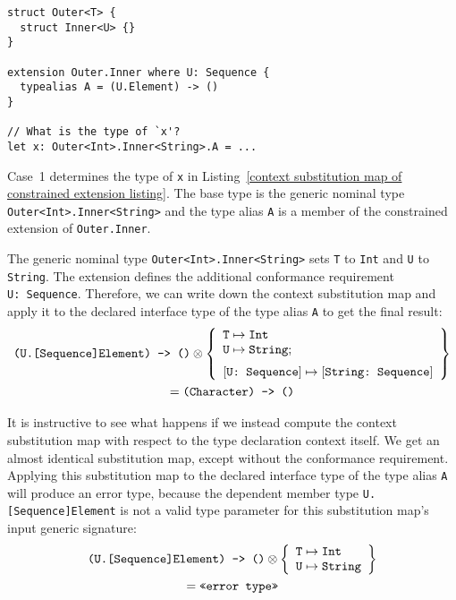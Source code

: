 \documentclass[../generics]{subfiles}
\begin{document}
\begin{listing}\label{context substitution map of constrained extension listing}
\begin{Verbatim}
struct Outer<T> {
  struct Inner<U> {}
}

extension Outer.Inner where U: Sequence {
  typealias A = (U.Element) -> ()
}

// What is the type of `x'?
let x: Outer<Int>.Inner<String>.A = ...
\end{Verbatim}
\end{listing}
\begin{example}
Case~1 determines the type of \texttt{x} in Listing~\ref{context substitution map of constrained extension listing}. The base type is the generic nominal type \texttt{Outer<Int>.Inner<String>} and the type alias \texttt{A} is a member of the constrained extension of \texttt{Outer.Inner}.

The generic nominal type \texttt{Outer<Int>.Inner<String>} sets \texttt{T} to \texttt{Int} and \texttt{U} to \texttt{String}. The extension defines the additional conformance requirement \texttt{U:~Sequence}. Therefore, we can write down the context substitution map and apply it to the declared interface type of the type alias \texttt{A} to get the final result:
\begin{multline*}
\texttt{(U.[Sequence]Element) -> ()} \otimes
\SubstMapLongC{
\SubstType{T}{Int}\\
\SubstType{U}{String}
}{
\SubstConf{U}{String}{Sequence}
}\\
= \texttt{(Character) -> ()}
\end{multline*}
\end{example}
\begin{example}
It is instructive to see what happens if we instead compute the context substitution map with respect to the type declaration context itself. We get an almost identical substitution map, except without the conformance requirement. Applying this substitution map to the declared interface type of the type alias \texttt{A} will produce an error type, because the dependent member type \texttt{U.[Sequence]Element} is not a valid type parameter for this substitution map's input generic signature:
\begin{multline*}
\texttt{(U.[Sequence]Element) -> ()} \otimes
\left\{\begin{array}{l}
\texttt{T} \mapsto \texttt{Int}\\
\texttt{U} \mapsto \texttt{String}
\end{array}\right\}\\
= \texttt{<<error type>>}
\end{multline*}
\end{example}
\end{document}
